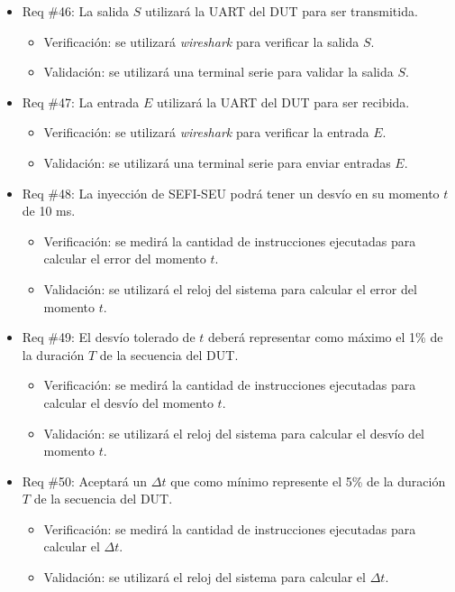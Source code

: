 \documentclass[
11pt, %
]{charter}
\begin{document}
\begin{itemize}
\item Req \#46: La salida $ S $ utilizará la UART del DUT para ser transmitida.
\begin{itemize}
    \item Verificación: se utilizará \emph{wireshark} para verificar la salida $ S $.
    \item Validación: se utilizará una terminal serie para validar la salida $ S $.
\end{itemize}

\item Req \#47: La entrada $ E $ utilizará la UART del DUT para ser recibida.
\begin{itemize}
    \item Verificación: se utilizará \emph{wireshark} para verificar la entrada $ E $.
    \item Validación: se utilizará una terminal serie para enviar entradas $ E $.
\end{itemize}

\item Req \#48: La inyección de SEFI-SEU podrá tener un desvío en su momento $ t $ de 10 ms.
\begin{itemize}
    \item Verificación: se medirá la cantidad de instrucciones ejecutadas para calcular el error del momento $ t $.
    \item Validación: se utilizará el reloj del sistema para calcular el error del momento $ t $.
\end{itemize}

\item Req \#49: El desvío tolerado de $ t $ deberá representar como máximo el 1\% de la duración $ T $ de la secuencia del DUT.
\begin{itemize}
    \item Verificación: se medirá la cantidad de instrucciones ejecutadas para calcular el desvío del momento $ t $.
    \item Validación: se utilizará el reloj del sistema para calcular el desvío del momento $ t $.
\end{itemize}

\item Req \#50: Aceptará un $ \Delta t $ que como mínimo represente el 5\% de la duración $ T $ de la secuencia del DUT.
\begin{itemize}
    \item Verificación: se medirá la cantidad de instrucciones ejecutadas para calcular el $ \Delta t $.
    \item Validación: se utilizará el reloj del sistema para calcular el $ \Delta t $.
\end{itemize}


\end{itemize}
\end{document}
